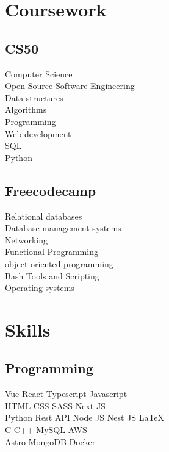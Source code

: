 \documentclass[]{deedy-resume-openfont}
\begin{document}
\begin{minipage}[t]{0.33\textwidth}
\section{Coursework}
\subsection{CS50}
Computer Science \\
Open Source Software Engineering \\
Data structures \\
Algorithms \\
Programming \\
Web development \\
SQL \\
Python \\
\sectionsep

\subsection{Freecodecamp}
Relational databases \\
Database management systems \\
Networking \\
Functional Programming \\
object oriented programming \\
Bash Tools and Scripting \\
Operating systems \\


\section{Skills}
\subsection{Programming}
Vue \textbullet{} React \textbullet{} Typescript \textbullet{} Javascript \\
HTML \textbullet{} CSS \textbullet{} SASS \textbullet{} Next JS \\
Python \textbullet{} Rest API \textbullet{} Node JS \textbullet{} Nest JS \textbullet{} \LaTeX\ \\ 
C \textbullet{} C++ \textbullet{} MySQL \textbullet{} AWS \\
\textbullet{} Astro \textbullet{} MongoDB \textbullet{} Docker

\sectionsep

%
%

\end{minipage} 
\end{document}
